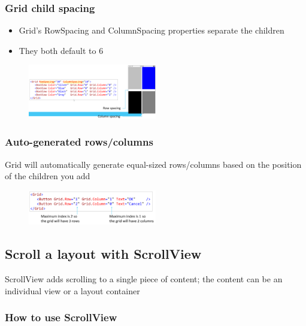 \documentclass{article}
\begin{document}
\subsubsection{Grid child spacing}

\begin{itemize}
    \item Grid's RowSpacing and ColumnSpacing properties separate the children
    \item They both default to 6
\end{itemize}

\begin{figure}[H]
    \centering
    \includegraphics[width=0.5\textwidth]{xaml-grid-child-spacing.png}
    \caption{}
\end{figure}

\subsubsection{Auto-generated rows/columns}

Grid will automatically generate equal-sized rows/columns based on the position of the children you add

\begin{figure}[H]
    \centering
    \includegraphics[width=0.5\textwidth]{xaml-grid-autogenerated.png}
    \caption{}
\end{figure}

\subsection{Scroll a layout with ScrollView}

ScrollView adds scrolling to a single piece of content; the content can be an
individual view or a layout container

\subsubsection{How to use ScrollView}
\end{document}
